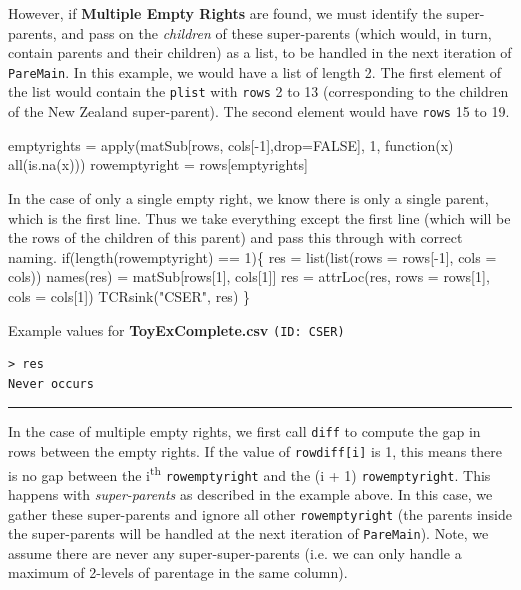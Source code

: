\documentclass[a4paper]{article}
\begin{document}
\begin{table}[!h]
\begin{minipage}{0.6\linewidth}
  However, if \textbf{Multiple Empty Rights} are found, we must
  identify the super-parents, and pass on the \emph{children} of these
  super-parents (which would, in turn, contain parents and their
  children) as a list, to be handled in the next iteration of
  \verb|PareMain|. In this example, we would have a list of length
  2. The first element of the list would contain the \verb|plist| with
  \verb|rows| 2 to 13 (corresponding to the children of the New
  Zealand super-parent). The second element would have \verb|rows| 15
  to 19.
\end{minipage}
\end{table}

\nwenddocs{}\endmoddef
emptyrights = apply(matSub[rows, cols[-1],drop=FALSE], 1,
  function(x) all(is.na(x)))
rowemptyright = rows[emptyrights]
\nwendcode{}\nwdocspar

In the case of only a single empty right, we know there is only a
single parent, which is the first line. Thus we take everything except
the first line (which will be the rows of the children of this parent)
and pass this through with correct naming.
\nwenddocs{}\endmoddef
if(length(rowemptyright) == 1)\{
  res = list(list(rows = rows[-1], cols = cols))
  names(res) = matSub[rows[1], cols[1]]
  res = attrLoc(res, rows = rows[1], cols = cols[1])
  TCRsink("CSER", res)
\}
\nwendcode{}\nwdocspar

Example values for \textbf{ToyExComplete.csv} \texttt{(ID: CSER)}
\begin{verbatim}
> res
Never occurs
\end{verbatim}
\vspace{-1.5em}
\noindent\rule{0.25\textwidth}{0.4pt}
\vspace{0.5em}

In the case of multiple empty rights, we first call \verb|diff| to
compute the gap in rows between the empty rights. If the value of
\verb|rowdiff[i]| is 1, this means there is no gap between the
i\textsuperscript{th} \verb|rowemptyright| and the (i + 1)
\verb|rowemptyright|. This happens with \emph{super-parents} as
described in the example above. In this case, we gather these
super-parents and ignore all other \verb|rowemptyright| (the parents
inside the super-parents will be handled at the next iteration of
\verb|PareMain|). Note, we assume there are never any
super-super-parents (i.e. we can only handle a maximum of 2-levels of
parentage in the same column).
\end{document}
